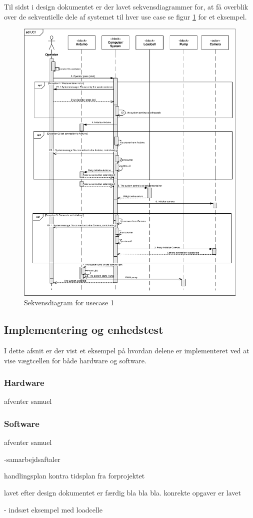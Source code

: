 Til sidst i design dokumentet er der lavet sekvensdiagrammer for, at få overblik over de sekventielle dele af systemet til hver use case se figur \ref{fig:sekvendisgr} for et eksempel.
\begin{figure}[H]
	\centering
	\includegraphics[width=1\textwidth]{pdf/UC1_cropped.pdf}
	\caption{Sekvensdiagram for usecase 1}
	\label{fig:sekvendisgr}
\end{figure}


\subsection{Implementering og enhedstest}
\label{subsec:Implement}
I dette afsnit er der vist et eksempel på hvordan delene er implementeret ved at vise vægtcellen for både hardware og software.

\subsubsection{Hardware}
afventer samuel
\subsubsection{Software}
afventer samuel


-samarbejdsaftaler

handlingsplan kontra tidsplan fra forprojektet

lavet efter design dokumentet er færdig bla bla bla. konrekte opgaver er lavet

- indsæt eksempel med loadcelle
